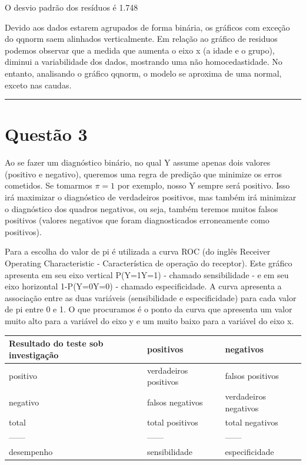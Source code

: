 \documentclass[11pt,]{article}
\begin{document}
O desvio padrão dos resíduos é 1.748

Devido aos dados estarem agrupados de forma binária, os gráficos com
exceção do qqnorm saem alinhados verticalmente. Em relação ao gráfico de
residuos podemos observar que a medida que aumenta o eixo x (a idade e o
grupo), diminui a variabilidade dos dados, mostrando uma não
homocedastidade. No entanto, analisando o gráfico qqnorm, o modelo se
aproxima de uma normal, exceto nas caudas.

\begin{center}\rule{0.5\linewidth}{\linethickness}\end{center}

\section{Questão 3}\label{questao-3}

 Ao se fazer um diagnóstico binário, no qual Y assume apenas dois
valores (positivo e negativo), queremos uma regra de predição que
minimize os erros cometidos. Se tomarmos \(\pi =1\) por exemplo, nosso Y
sempre será positivo. Isso irá maximizar o diagnóstico de verdadeiros
positivos, mas também irá minimizar o diagnóstico dos quadros negativos,
ou seja, também teremos muitos falsos positivos (valores negativos que
foram diagnosticados erroneamente como positivos).

Para a escolha do valor de pi é utilizada a curva ROC (do inglês
Receiver Operating Characteristic - Característica de operação do
receptor). Este gráfico apresenta em seu eixo vertical
P(Y=1\textbar{}Y=1) - chamado sensibilidade - e em seu eixo horizontal
1-P(Y=0\textbar{}Y=0) - chamado especificidade. A curva apresenta a
associação entre as duas variáveis (sensibilidade e especificidade) para
cada valor de pi entre 0 e 1. O que procuramos é o ponto da curva que
apresenta um valor muito alto para a variável do eixo y e um muito baixo
para a variável do eixo x.

\begin{longtable}[]{@{}lll@{}}
\toprule
Resultado do teste sob investigação & positivos &
negativos\tabularnewline
\midrule
\endhead
positivo & verdadeiros positivos & falsos positivos\tabularnewline
negativo & falsos negativos & verdadeiros negativos\tabularnewline
total & total positivos & total negativos\tabularnewline
------ & ------ & ------\tabularnewline
desempenho & sensibilidade & especificidade\tabularnewline
\bottomrule
\end{longtable}

\newpage
\singlespacing 

\end{document}
